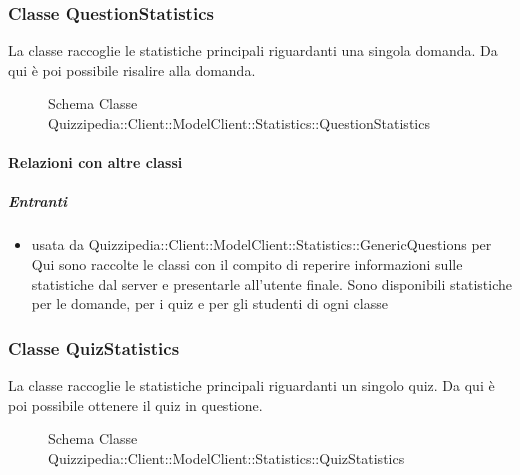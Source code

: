 \subsubsection{Classe QuestionStatistics}
La classe raccoglie le statistiche principali riguardanti una singola domanda. Da qui è poi possibile risalire alla domanda.
\begin{figure}[H]
\centering
\noindent{}
\caption[Schema Classe QuestionStatistics]{Schema Classe Quizzipedia::Client::ModelClient::Statistics::QuestionStatistics}
\end{figure}
\paragraph{Relazioni con altre classi}
\subparagraph{Entranti}
\begin{itemize}
\item usata da Quizzipedia::Client::ModelClient::Statistics::GenericQuestions per Qui sono raccolte le classi con il compito di reperire informazioni sulle statistiche dal server e presentarle all'utente finale. Sono disponibili statistiche per le domande, per i quiz e per gli studenti di ogni classe
\end{itemize}
\subsubsection{Classe QuizStatistics}
La classe raccoglie le statistiche principali riguardanti un singolo quiz. Da qui è poi possibile ottenere il quiz in questione.
\begin{figure}[H]
\centering
\noindent{}
\caption[Schema Classe QuizStatistics]{Schema Classe Quizzipedia::Client::ModelClient::Statistics::QuizStatistics}
\end{figure}
